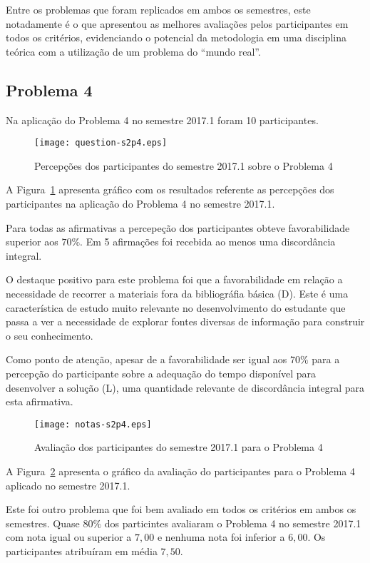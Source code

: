 Entre os problemas que foram replicados em ambos os semestres, este
notadamente é o que apresentou as melhores avaliações pelos participantes
em todos os critérios, evidenciando o potencial da metodologia em uma
disciplina teórica com a utilização de um problema do ``mundo real''.

\subsection{Problema 4}
Na aplicação do Problema 4 no semestre 2017.1 foram 10 participantes.

\begin{figure}[!htb]
\centering
\texttt{[image: question-s2p4.eps]}
\caption{Percepções dos participantes do semestre 2017.1 sobre o Problema 4}
\label{percep-s2p4}
\end{figure}

A Figura~\ref{percep-s2p4} apresenta gráfico com os resultados referente
as percepções dos participantes na aplicação do
Problema 4 no semestre 2017.1.

Para todas as afirmativas a percepeção dos participantes obteve favorabilidade
superior aos $70\%$. Em 5 afirmações foi recebida ao menos uma discordância
integral.

O destaque positivo para este problema foi que a favorabilidade em relação
a necessidade de recorrer a materiais fora da bibliográfia básica (D).
Este é uma característica de estudo muito relevante no desenvolvimento
do estudante que passa a ver a necessidade de explorar fontes diversas
de informação para construir o seu conhecimento.

Como ponto de atenção, apesar de a favorabilidade ser igual aos $70\%$ para
a percepção do participante sobre a adequação do tempo disponível para desenvolver
a solução (L), uma quantidade relevante de discordância integral para esta afirmativa.

\begin{figure}[!htb]
\centering
\texttt{[image: notas-s2p4.eps]}
\caption{Avaliação dos participantes do semestre 2017.1 para o Problema 4}
\label{aval-s2p4}
\end{figure}

A Figura~\ref{aval-s2p4} apresenta o gráfico da
avaliação do participantes para o Problema 4 aplicado no semestre 2017.1.

Este foi outro problema que foi bem avaliado em todos os critérios em ambos
os semestres.
Quase $80\%$ dos particintes avaliaram o Problema 4 no semestre 2017.1 com nota igual
ou superior a $7,00$ e nenhuma nota foi inferior a $6,00$.
Os participantes atribuíram em média $7,50$.



